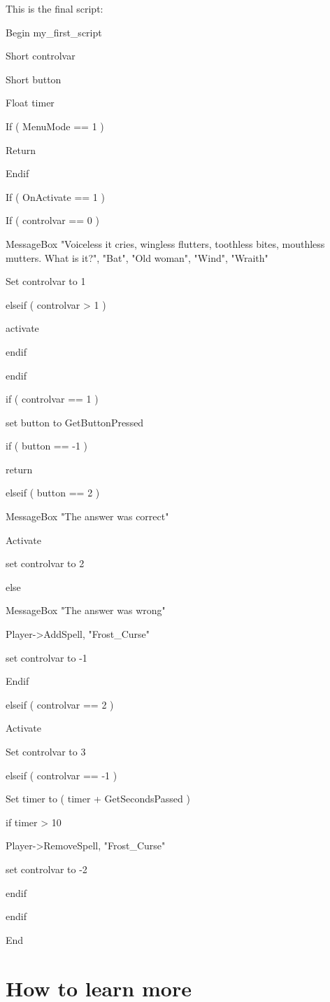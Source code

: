 \documentclass[
]{article}
\begin{document}
This is the final script:

Begin my\_first\_script

Short controlvar

Short button

Float timer

If ( MenuMode == 1 )

Return

Endif

If ( OnActivate == 1 )

If ( controlvar == 0 )

MessageBox "Voiceless it cries, wingless flutters, toothless bites,
mouthless mutters. What is it?", "Bat", "Old woman", "Wind", "Wraith"

Set controlvar to 1

elseif ( controlvar \textgreater{} 1 )

activate

endif

endif

if ( controlvar == 1 )

set button to GetButtonPressed

if ( button == -1 )

return

elseif ( button == 2 )

MessageBox "The answer was correct"

Activate

set controlvar to 2

else

MessageBox "The answer was wrong"

Player-\textgreater AddSpell, "Frost\_Curse"

set controlvar to -1

Endif

elseif ( controlvar == 2 )

Activate

Set controlvar to 3

elseif ( controlvar == -1 )

Set timer to ( timer + GetSecondsPassed )

if timer \textgreater{} 10

Player-\textgreater RemoveSpell, "Frost\_Curse"

set controlvar to -2

endif

endif

End

\hypertarget{how-to-learn-more}{%
\section{How to learn more}\label{how-to-learn-more}}
\end{document}

